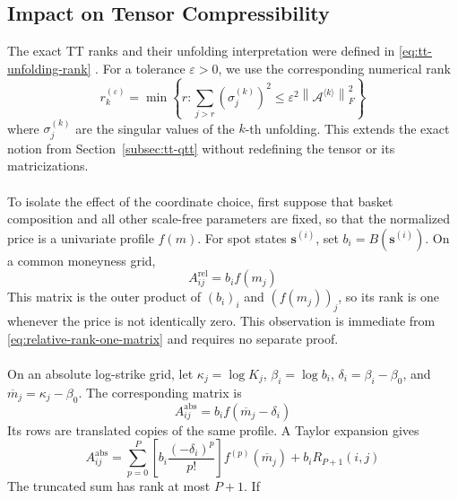 \documentclass{article}
\numberwithin{equation}{subsection}
\theoremstyle{definition}
\theoremstyle{remark}
\begin{document}
\subsection{Impact on Tensor Compressibility}
\label{subsec:compressibility-impact}
The exact TT ranks and their unfolding interpretation were defined in
\eqref{eq:tt-unfolding-rank} \cite{oseledets2011tensorTrain}. For a tolerance
\(\varepsilon>0\), we use the corresponding numerical rank
\begin{equation}
r_k^{(\varepsilon)}
=
\min
\left\{
r:
\sum_{j>r}
\left(
\sigma_j^{(k)}
\right)^2
\leq
\varepsilon^2
\left\|
\mathcal{A}^{\langle k\rangle}
\right\|_F^2
\right\}
\label{eq:numerical-tt-rank}
\end{equation}
where \(\sigma_j^{(k)}\) are the singular values of the \(k\)-th unfolding.
This extends the exact notion from Section~\ref{subsec:tt-qtt} without
redefining the tensor or its matricizations.\\
\\
To isolate the effect of the coordinate choice, first suppose that basket
composition and all other scale-free parameters are fixed, so that the
normalized price is a univariate profile \(f(m)\). For spot states
\(\boldsymbol{s}^{(i)}\), set
\(b_i=B(\boldsymbol{s}^{(i)})\). On a common moneyness grid,
\begin{equation}
A_{ij}^{\mathrm{rel}}
=
b_i f(m_j)
\label{eq:relative-rank-one-matrix}
\end{equation}
This matrix is the outer product of
\((b_i)_i\) and \((f(m_j))_j\), so its rank is one whenever the price is not
identically zero. This observation is immediate from
\eqref{eq:relative-rank-one-matrix} and requires no separate proof. \\
\\
On an absolute log-strike grid, let
\(\kappa_j=\log K_j\), \(\beta_i=\log b_i\),
\(\delta_i=\beta_i-\beta_0\), and
\(\overline m_j=\kappa_j-\beta_0\). The corresponding matrix is
\begin{equation}
A_{ij}^{\mathrm{abs}}
=
b_i f(\overline m_j-\delta_i)
\label{eq:absolute-translated-matrix}
\end{equation}
Its rows are translated copies of the same profile. A Taylor expansion gives
\begin{equation}
A_{ij}^{\mathrm{abs}}
=
\sum_{p=0}^{P}
\left[
b_i\frac{(-\delta_i)^p}{p!}
\right]
f^{(p)}(\overline m_j)
+
b_iR_{P+1}(i,j)
\label{eq:translation-separation}
\end{equation}
The truncated sum has rank at most \(P+1\). If
\end{document}
